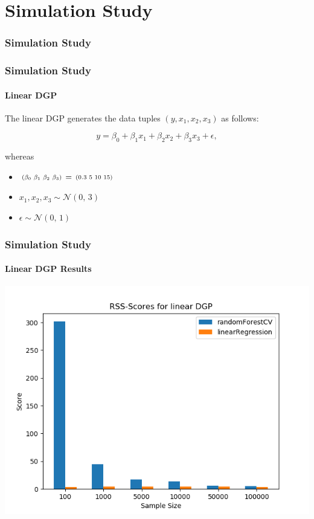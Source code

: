 

\section{Simulation Study}
\frame{\sectionpage}
\frametitle{Simulation Study}
\begin{frame}
    \frametitle{Simulation Study}
    \framesubtitle{Linear DGP}
    The linear DGP generates the data tuples \( (y, x_{1}, x_{2}, x_{3}) \) as follows:

    \begin{equation*}\label{eq:linear_dgp}
        y = \beta_{0} + \beta_{1} x_{1} + \beta_{2} x_{2} + \beta_{3} x_{3} + \epsilon,
    \end{equation*}
    
    whereas
    \begin{itemize}
        \item $ \begin{smallmatrix}(\beta_{0} & \beta_{1} & \beta_{2} & \beta_{3})\end{smallmatrix} = \begin{smallmatrix}(0.3 & 5 & 10 & 15)\end{smallmatrix}$
        \item $x_{1}, x_{2}, x_{3} \sim \mathcal{N}(0,\,3)$
        \item $\epsilon \sim \mathcal{N}(0,\,1)$
    \end{itemize}
\end{frame}

\begin{frame}
    \frametitle{Simulation Study}
    \framesubtitle{Linear DGP Results}
	\begin{center}		
		\includegraphics[height=0.7\textheight]{images/forest_vs_ols_linearDGP.png}
	\end{center}
\end{frame}


